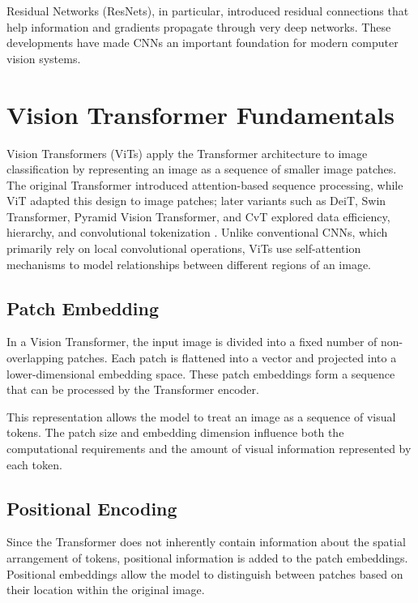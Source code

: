 \documentclass[conference]{IEEEtran}
\begin{document}
Residual Networks (ResNets), in particular, introduced residual connections that help information and gradients propagate through very deep networks. These developments have made CNNs an important foundation for modern computer vision systems.

\section{Vision Transformer Fundamentals}

Vision Transformers (ViTs) apply the Transformer architecture to image classification by representing an image as a sequence of smaller image patches. The original Transformer introduced attention-based sequence processing, while ViT adapted this design to image patches; later variants such as DeiT, Swin Transformer, Pyramid Vision Transformer, and CvT explored data efficiency, hierarchy, and convolutional tokenization \cite{vaswani2017,dosovitskiy2021,touvron2021,liu2021swin,wang2021pvt,wu2021cvt}. Unlike conventional CNNs, which primarily rely on local convolutional operations, ViTs use self-attention mechanisms to model relationships between different regions of an image.

\subsection{Patch Embedding}

In a Vision Transformer, the input image is divided into a fixed number of non-overlapping patches. Each patch is flattened into a vector and projected into a lower-dimensional embedding space. These patch embeddings form a sequence that can be processed by the Transformer encoder.

This representation allows the model to treat an image as a sequence of visual tokens. The patch size and embedding dimension influence both the computational requirements and the amount of visual information represented by each token.

\subsection{Positional Encoding}

Since the Transformer does not inherently contain information about the spatial arrangement of tokens, positional information is added to the patch embeddings. Positional embeddings allow the model to distinguish between patches based on their location within the original image.
\end{document}
